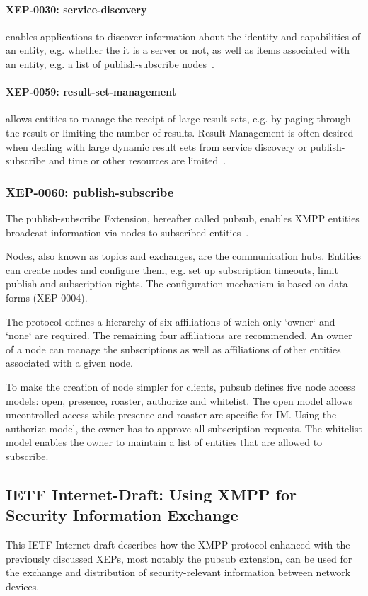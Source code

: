 \paragraph{XEP-0030: \gls{service-discovery}} enables applications to discover information about the identity and capabilities of an entity, e.g. whether the it is a server or not, as well as items associated with an entity, e.g. a list of \gls{publish-subscribe} nodes~\cite{xep-0030}.

\paragraph{XEP-0059: \Gls{result-set-management}} allows entities to manage the receipt of large result sets, e.g. by paging through the result or limiting the number of results. Result Management is often desired when dealing with large dynamic result sets from service discovery or publish-subscribe and time or other resources are limited~\cite{xep-0059}.

\subsubsection{XEP-0060: \Gls{publish-subscribe}}
The \gls{publish-subscribe} Extension, hereafter called \gls{pubsub}, enables XMPP entities broadcast information via nodes to subscribed entities~\cite{xep-0060}.

Nodes, also known as topics and exchanges, are the communication hubs. Entities can create nodes and configure them, e.g. set up subscription timeouts, limit publish and subscription rights. The configuration mechanism is based on data forms (XEP-0004).

The protocol defines a hierarchy of six affiliations of which only `owner` and `none` are required. The remaining four affiliations are recommended. An owner of a node can manage the subscriptions as well as affiliations of other entities associated with a given node. 

To make the creation of node simpler for clients, \gls{pubsub} defines five node access models: open, presence, roaster, authorize and whitelist.
The open model allows uncontrolled access while presence and roaster are specific for IM. Using the authorize model, the owner has to approve all subscription requests. The whitelist model enables the owner to maintain a list of entities that are allowed to subscribe.


\subsection{IETF Internet-Draft: Using XMPP for Security Information Exchange}
This IETF Internet draft describes how the XMPP protocol enhanced with the previously discussed XEPs, most notably the \gls{pubsub} extension, can be used for the exchange and distribution of security-relevant information between network devices.

